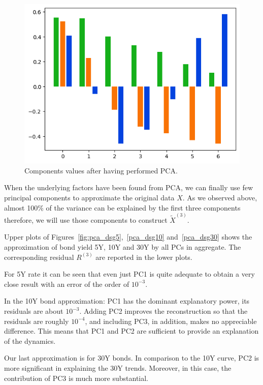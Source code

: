\begin{figure}[hbtp]
	\centering
	\includegraphics[width=0.7\linewidth]{figures/pca_loading_matrix}
	\caption{Components values after having performed PCA.}
	\label{fig:yield_pca_components}
\end{figure}

When the underlying factors have been found from PCA, we can finally use few principal components to approximate the original data $X$. As we observed above, almost 100\% of the variance can be explained by the first three components therefore, we will use those components to construct $\tilde{X}^{(3)}$.

Upper plots of Figures~\ref{fig:pca_dsg5},~\ref{pca_dsg10} and~\ref{pca_dsg30} shows the approximation of bond yield 5Y, 10Y and 30Y by all PCs in aggregate.
The corresponding residual $R^{(3)}$ are reported in the lower plots.

For 5Y rate it can be seen that even just PC1 is quite adequate to obtain a very close result with an error of the order of $10^{-3}$.

In the 10Y bond approximation: PC1 has the dominant explanatory power, its residuals are about $10^{-3}$. Adding PC2 improves the reconstruction so that the residuals are roughly $10^{-4}$, and including PC3, in addition, makes no appreciable difference. This means that PC1 and PC2 are sufficient to provide an explanation of the dynamics.

Our last approximation is for 30Y bonds. In comparison to the 10Y curve, PC2 is more significant in explaining the 30Y trends. Moreover, in this case, the contribution of PC3 is much more substantial.


